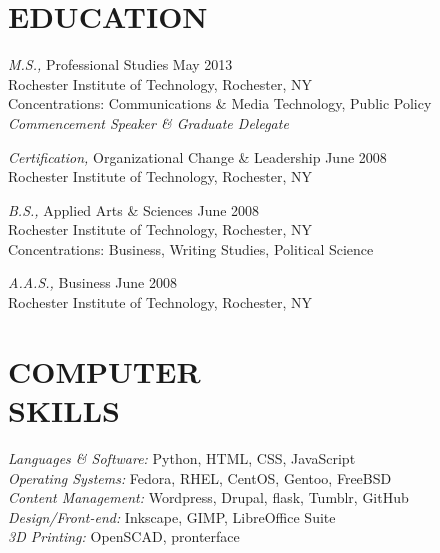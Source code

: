 \documentclass[margin]{res}
\begin{document}
\begin{resume}
\section{EDUCATION}
    \textsl{M.S.,} Professional Studies \hfill May 2013\\
    Rochester Institute of Technology, Rochester, NY\\
    Concentrations: Communications \& Media Technology, Public Policy\\
    \textsl{Commencement Speaker \& Graduate Delegate}

    \textsl{Certification,} Organizational Change \& Leadership \hfill June 2008\\
    Rochester Institute of Technology, Rochester, NY

    \textsl{B.S.,} Applied Arts \& Sciences \hfill June 2008\\
    Rochester Institute of Technology, Rochester, NY\\
    Concentrations: Business, Writing Studies, Political Science

    \textsl{A.A.S.,} Business \hfill June 2008\\
    Rochester Institute of Technology, Rochester, NY

\section{COMPUTER \\ SKILLS}
    {\sl Languages \& Software:} Python, HTML, CSS, JavaScript\\
    {\sl Operating Systems:} Fedora, RHEL, CentOS, Gentoo, FreeBSD\\
    {\sl Content Management:} Wordpress, Drupal, flask, Tumblr, GitHub\\
    {\sl Design/Front-end:} Inkscape, GIMP, LibreOffice Suite\\
    {\sl 3D Printing:} OpenSCAD, pronterface
\end{resume}
\end{document}
